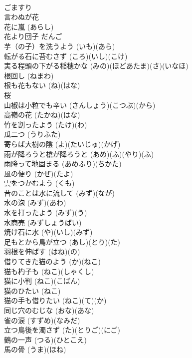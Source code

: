 \documentclass[8pt]{extreport}
\begin{document}
\begin{CJK}{UTF8}{min}
\\	ごますり			
\\	言わぬが花			
\\	花に嵐		(あらし)	
\\	花より団子		だんご	
\\	芋（の子）を洗うよう		(いも)(あら)	
\\	転がる石に苔むさず		(ころ)(いし)(こけ)	
\\	実る程頭の下がる稲穂かな		(みの)(ほどあたま)(さ)(いなほ)	
\\	根回し		(ねまわ)	
\\	根も花もない		(ね)(はな)	
\\	桜			
\\	山椒は小粒でも辛い		(さんしょう)(こつぶ)(から)	
\\	高嶺の花		(たかね)(はな)	
\\	竹を割ったよう		(たけ)(わ)	
\\	瓜二つ		(うりふた)	
\\	寄らば大樹の陰		(よ)(たいじゅ)(かげ)	
\\	雨が降ろうと槍が降ろうと		(あめ)(ふ)(やり)(ふ)	
\\	雨降って地固まる		(あめふり)(ちかた)	
\\	風の便り		(かぜ)(たよ)	
\\	雲をつかむよう		(くも)	
\\	昔のことは水に流して		(みず)(なが)	
\\	水の泡		(みず)(あわ)	
\\	水を打ったよう		(みず)(う)	
\\	水商売		(みずしょうばい)	
\\	焼け石に水		(や)(いし)(みず)	
\\	足もとから鳥が立つ		(あし)(とり)(た)	
\\	羽根を伸ばす		(はね)(の)	
\\	借りてきた猫のよう		(か)(ねこ)	
\\	猫も杓子も		(ねこ)(しゃくし)	
\\	猫に小判		(ねこ)(こばん)	
\\	猫のひたい		(ねこ)	
\\	猫の手も借りたい		(ねこ)(て)(か)	
\\	同じ穴のむじな		(おな)(あな)	
\\	雀の涙		(すずめ)(なみだ)	
\\	立つ鳥後を濁さず		(た)(とりご)(にご)	
\\	鶴の一声		(つる)(ひとこえ)	
\\	馬の骨		(うま)(ほね)	

\end{CJK}
\end{document}
